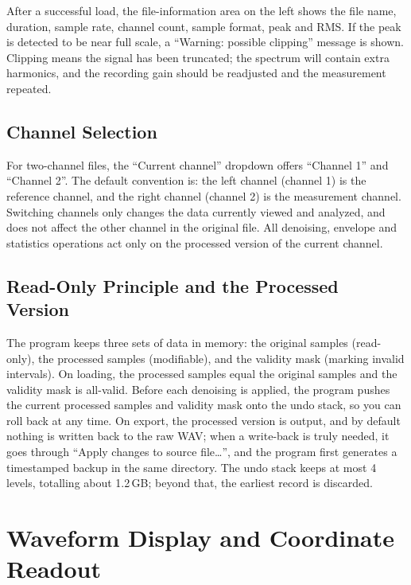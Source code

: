 \documentclass[UTF8,a4paper,12pt]{ctexart}
\begin{document}
After a successful load, the file-information area on the left shows the file name, duration, sample rate, channel count, sample format, peak and RMS. If the peak is detected to be near full scale, a ``Warning: possible clipping'' message is shown. Clipping means the signal has been truncated; the spectrum will contain extra harmonics, and the recording gain should be readjusted and the measurement repeated.

\subsection{Channel Selection}

For two-channel files, the ``Current channel'' dropdown offers ``Channel 1'' and ``Channel 2''. The default convention is: the left channel (channel 1) is the reference channel, and the right channel (channel 2) is the measurement channel. Switching channels only changes the data currently viewed and analyzed, and does not affect the other channel in the original file. All denoising, envelope and statistics operations act only on the processed version of the current channel.

\subsection{Read-Only Principle and the Processed Version}

The program keeps three sets of data in memory: the original samples (read-only), the processed samples (modifiable), and the validity mask (marking invalid intervals). On loading, the processed samples equal the original samples and the validity mask is all-valid. Before each denoising is applied, the program pushes the current processed samples and validity mask onto the undo stack, so you can roll back at any time. On export, the processed version is output, and by default nothing is written back to the raw WAV; when a write-back is truly needed, it goes through ``Apply changes to source file\dots'', and the program first generates a timestamped backup in the same directory. The undo stack keeps at most 4 levels, totalling about 1.2\,GB; beyond that, the earliest record is discarded.

\section{Waveform Display and Coordinate Readout}
\end{document}
